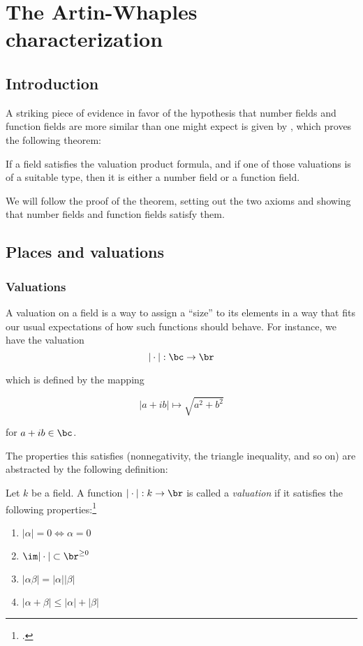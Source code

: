 \chapter{The Artin-Whaples characterization}
\section{Introduction}
\label{sec:orgheadline1}

A striking piece of evidence in favor of the hypothesis that number fields and
function fields are more similar than one might expect is given by
\cite{artinwhaples}, which proves the following theorem:

\begin{thm}
  \label{thm:maintheorem}
  If a field satisfies the valuation product formula, and if one of those
  valuations is of a suitable type, then it is either a number field or a
  function field.
\end{thm}

We will follow the proof of the theorem, setting out the two axioms and showing
that number fields and function fields satisfy them.

\section{Places and valuations}
\label{sec:orgheadline6}

\subsection{Valuations}
\label{sec:valuations}

A valuation on a field is a way to assign a ``size'' to its elements in a way
that fits our usual expectations of how such functions should behave. For
instance, we have the valuation
\[ |\cdot| : \bc \to \br \]

which is defined by the mapping

\[ |a + ib| \mapsto \sqrt{a^2 + b^2} \]

for $a+ib\in\bc$.

The properties this satisfies (nonnegativity, the triangle inequality, and so
on) are abstracted by the following definition:

\begin{defn}
  Let $k$ be a field. A function $|\cdot|: k\to\br$ is called a
  \textit{valuation} if it satisfies the following properties:\footcite[section
  1]{artinwhaples}
  \begin{enumerate}
  \item $|\alpha| = 0 \iff \alpha = 0$
  \item $\im |\cdot|\subset {\br}^{\geq 0}$
  \item $|\alpha\beta| = |\alpha||\beta|$
  \item $|\alpha + \beta| \leq |\alpha| + |\beta|$
  \end{enumerate}
\end{defn}


